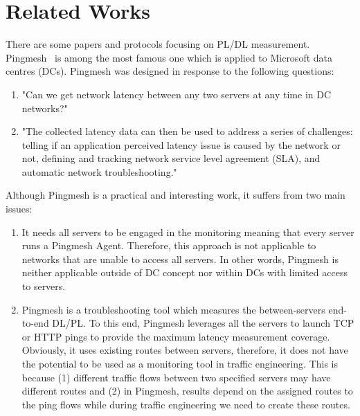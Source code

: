 \documentclass[10pt, journal, letterpaper]{IEEEtran}
\begin{document}
\section{Related Works}
There are some papers and protocols focusing on PL/DL measurement. Pingmesh~\cite{guo2015pingmesh} is among the most famous one which is applied to Microsoft data centres (DCs). Pingmesh was designed in response to the following questions: 
\begin{enumerate}[leftmargin=*]
    \item "Can we get network latency between any two servers at any time in DC networks?" \cite{guo2015pingmesh}
    \item "The collected latency data can then be used to address a series of challenges: telling if an application perceived latency issue is caused by the network or not, defining and tracking network service level agreement (SLA), and automatic network troubleshooting."\cite{guo2015pingmesh}
\end{enumerate}
Although Pingmesh is a practical and interesting work, it suffers from two main issues:
\begin{enumerate}[leftmargin=*]
    \item It needs all servers to be engaged in the monitoring meaning that every server runs a Pingmesh Agent. Therefore, this approach is not applicable to networks that are unable to access all servers. In other words, Pingmesh is neither applicable outside of DC concept nor within DCs with limited access to servers.
    \item Pingmesh is a troubleshooting tool which measures the between-servers end-to-end DL/PL. To this end, Pingmesh leverages all the servers to launch TCP or HTTP pings to provide the maximum latency measurement coverage. Obviously, it uses existing routes between servers, therefore, it does not have the potential to be used as a monitoring tool in traffic engineering. This is because (1) different traffic flows between two specified servers may have different routes and (2) in Pingmesh, results depend on the assigned routes to the ping flows while during traffic engineering we need to create these routes.
\end{enumerate}
    
\end{document}
